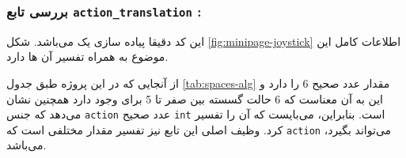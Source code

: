 \begin{table}
\caption{تعریف  و   در پروژه}
\label{tab:spaces-alg}
\end{table}



\subsubsection{بررسی تابع \textbf{\texttt{action\_translation} :}}
این کد دقیقا پیاده سازی یک  می‌باشد. شکل \ref{fig:minipage-joystick} اطلاعات کامل این موضوع به همراه تفسیر آن ها دارد. 

از آنجایی که در این پروژه  طبق جدول \ref{tab:spaces-alg} مقدار عدد صحیح 6 را دارد و این به آن معناست که 6 حالت گسسته بین صفر تا 5 برای  وجود دارد همچنین نشان می‌دهد که جنس \texttt{action} عدد صحیح \texttt{int} است. بنابراین، می‌بایست که آن را تفسیر کرد. وظیف اصلی این تابع نیز تفسیر مقدار مختلفی است که \texttt{action} می‌تواند بگیرد، می‌باشد.
 





